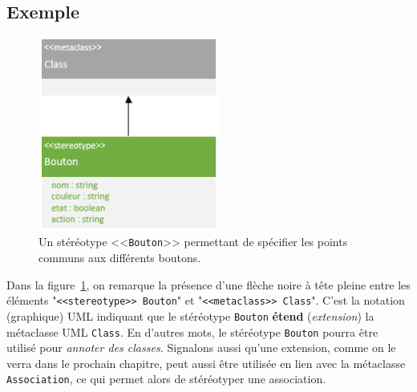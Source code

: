 \subsection*{Exemple}
%
\begin{figure}
    \begin{center}
    \includegraphics[width=6cm]{10_img/chap4/button.PNG}
    \caption{Un st\'er\'eotype <<\texttt{Bouton}>> permettant de sp\'ecifier les points communs aux diff\'erents boutons.}
    \label{fig.uml_but_definition}
    \end{center}
\end{figure}

Dans la figure~\ref{fig.uml_but_definition}, on remarque la présence d'une flèche noire à tête pleine entre les éléments "\texttt{<<stereotype>> Bouton}" et "\texttt{<<metaclass>>~Class}".
C'est la notation (graphique) UML indiquant que le st\'er\'eotype \texttt{Bouton} \textbf{étend} (\emph{extension}) la métaclasse UML \texttt{Class}.
%
En d'autres mots, le stéréotype \texttt{Bouton} pourra être utilisé pour \emph{annoter des classes.}
%
Signalons aussi qu'une extension, comme on le verra dans le prochain chapitre, peut aussi être utilisée en lien avec la métaclasse \texttt{Association}, ce qui permet alors de stéréotyper une association.

